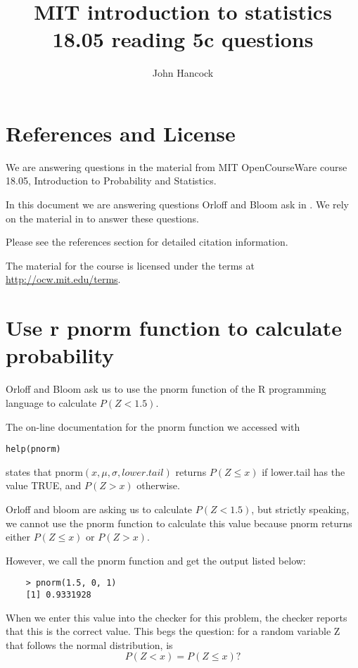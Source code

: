 \documentclass[a4paper,11pt]{article}
\author{John Hancock}
\title{MIT introduction to statistics 18.05  reading 5c questions}
\begin{document}
\maketitle
\tableofcontents
\section{References and License}
We are answering questions in the material from MIT OpenCourseWare
course 18.05, Introduction to Probability and Statistics.

In this document we are answering questions Orloff and Bloom ask in
\cite{reading5CQ}. We rely on the material in \cite{reading5c} to answer
these questions.

Please see the references section for detailed citation information.

The material for the course is licensed under the terms at
\url{http://ocw.mit.edu/terms}.

\section{Use r pnorm function to calculate probability}
Orloff and Bloom ask us to use the pnorm function of the R programming language
to calculate $P\left( Z < 1.5 \right)$.

The on-line documentation for the pnorm function we accessed with
\begin{lstlisting}
help(pnorm)
\end{lstlisting}
states that $\text{pnorm}\left(x, \mu, \sigma, lower.tail \right)$
returns $P \left( Z \leq x \right)$ if lower.tail has the value TRUE, and
$P \left( Z > x \right)$ otherwise.

Orloff and bloom are asking us to calculate
$P \left( Z < 1.5 \right)$, but strictly speaking, we cannot use the pnorm
function to calculate this value because pnorm returns either
$P \left(  Z \leq x \right)$ or $P \left( Z > x \right)$.

However, we call the pnorm function and get the output listed below:
\begin{lstlisting}
	> pnorm(1.5, 0, 1)
	[1] 0.9331928
\end{lstlisting}

When we enter this value into the checker for this problem, the checker reports
that this is the correct value.  This begs the question: for a random variable
Z that follows the normal distribution, is
\begin{equation}
	P \left( Z < x \right) = P \left(Z \leq x \right)?
\end{equation}
\end{document}
